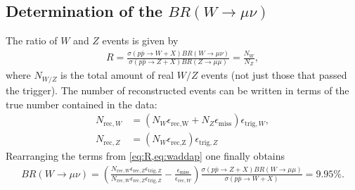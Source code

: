 \documentclass[twoside,        %
               BCOR12mm,       %
               ngerman,english, %
               fleqn,headsepline=false,footsepline=false
              ]{Vorlage/MFPREPORT}
\begin{document}
\subsection{Determination of the $BR(W\rightarrow\mu\nu)$}
The ratio of $W$ and $Z$ events is given by \cite{fprakt}
\begin{align}
    \label{eq:R}
    R=\frac{\sigma(p\bar p \rightarrow W+X)BR(W\rightarrow\mu\nu)}{\sigma(p\bar
    p \rightarrow Z+X)BR(Z\rightarrow\mu\mu)}=\frac{N_W}{N_Z},
\end{align}
where $N_{W/Z}$ is the total amount of real $W/Z$ events (not just those that
passed the trigger). The number of reconstructed events can be written in terms
of the true number contained in the data:
\begin{align}
    \label{eq:waddap}
    N_{\text{rec},W}&=(N_W \epsilon_\text{rec,W}+N_Z\epsilon_\text{miss})\epsilon_{\text{trig},W},\\
    N_{\text{rec},Z}&=(N_W \epsilon_\text{rec,Z})\epsilon_{\text{trig},Z}
\end{align}
Rearranging the terms from \cref{eq:R,eq:waddap} one finally obtains
\begin{align}
    \label{eq:BRRR}
    BR(W\rightarrow\mu\nu)=(\frac{N_{\text{rec},W}\epsilon_{\text{rec},Z}\epsilon_{\text{trig},Z}}{N_{\text{rec},W}\epsilon_{\text{rec},Z}\epsilon_{\text{trig},Z}}-\frac{\epsilon_{\text{miss}}}{\epsilon_{\text{rec},W}})\frac{\sigma(p\bar
    p\rightarrow Z+X)BR(W\rightarrow\mu\mu)}{\sigma(p\bar p\rightarrow
    W+X)}=9.95\%.
\end{align}

\label{ss:br}
\end{document}
